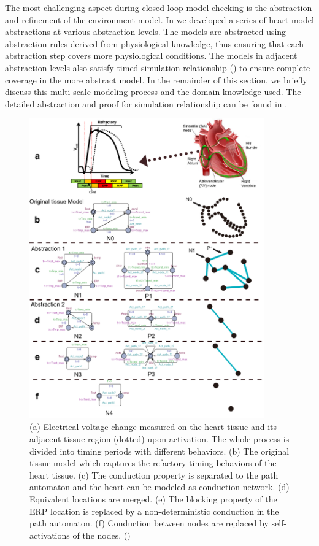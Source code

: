 The most challenging aspect during closed-loop model checking is the abstraction and refinement of the environment model. In \cite{STTT13} we developed a series of heart model abstractions at various abstraction levels. The models are abstracted using abstraction rules derived from physiological knowledge, thus ensuring that each abstraction step covers more physiological conditions. The models in adjacent abstraction levels also satisfy \textsf{timed-simulation} relationship (\cite{simulation}) to ensure complete coverage in the more abstract model. In the remainder of this section, we briefly discuss this multi-scale modeling process and the domain knowledge used. The detailed abstraction and proof for simulation relationship can be found in \cite{STTT13}.
\begin{figure}[!t]
\center
\includegraphics[width=0.9\textwidth]{figs/Heart_abs.pdf}
\caption{(a) Electrical voltage change measured on the heart tissue and its adjacent tissue region (dotted) upon activation. The whole process is divided into timing periods with different behaviors. (b) The original tissue model which captures the refactory timing behaviors of the heart tissue. (c) The conduction property is separated to the path automaton and the heart can be modeled as conduction network. (d) Equivalent locations are merged. (e) The blocking property of the ERP location is replaced by a non-deterministic conduction in the path automaton. (f) Conduction between nodes are replaced by self-activations of the nodes. (\cite{STTT13})}
\label{fig:HM_abs}
\end{figure} 
